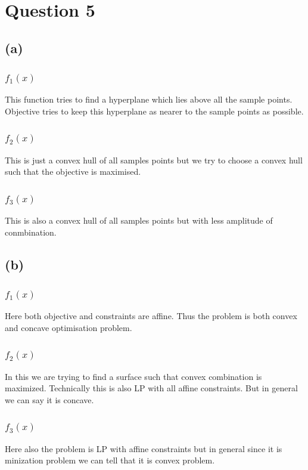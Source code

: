 \documentclass{article}
\begin{document}
\section*{\hfil Question 5}
\subsection*{(a)}
\subsubsection*{$f_1(x)$}
This function tries to find a hyperplane which lies above all the sample points. Objective tries to keep this hyperplane as nearer to the sample points as possible.
\subsubsection*{$f_2(x)$}
This is just a convex hull of all samples points but we try to choose a convex hull such that the objective is maximised.
\subsubsection*{$f_3(x)$}
This is also a convex hull of all samples points but with less amplitude of conmbination.
\subsection*{(b)}
\subsubsection*{$f_1(x)$}
Here both objective and constraints are affine. Thus the problem is both convex and concave optimisation problem.
\subsubsection*{$f_2(x)$}
In this we are trying to find a surface such that convex combination is maximized. Technically this is also LP with all affine constraints. But in general we can say it is concave.
\subsubsection*{$f_3(x)$}
Here also the problem is LP with affine constraints but in general since it is minization problem we can tell that it is convex problem.
\end{document}
